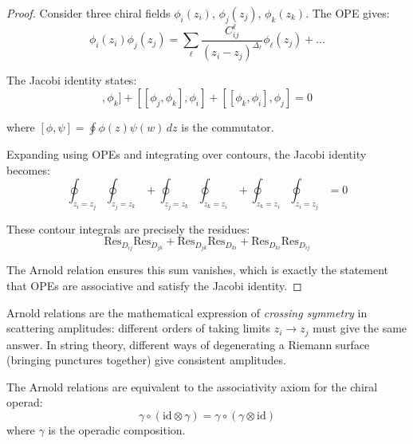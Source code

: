 \begin{proof}
Consider three chiral fields $\phi_i(z_i)$, $\phi_j(z_j)$, $\phi_k(z_k)$. The OPE gives:
\begin{equation}
\phi_i(z_i) \phi_j(z_j) = \sum_{\ell} \frac{C_{ij}^{\ell}}{(z_i - z_j)^{\Delta_\ell}} 
\phi_\ell(z_j) + \ldots
\end{equation}

The Jacobi identity states:
\begin{equation}
[[\phi_i, \phi_j], \phi_k] + [[\phi_j, \phi_k], \phi_i] + [[\phi_k, \phi_i], \phi_j] = 0
\end{equation}

where $[\phi, \psi] = \oint \phi(z) \psi(w) \, dz$ is the commutator.

Expanding using OPEs and integrating over contours, the Jacobi identity becomes:
\begin{equation}
\oint_{z_i = z_j} \oint_{z_j = z_k} + \oint_{z_j = z_k} \oint_{z_k = z_i} + 
\oint_{z_k = z_i} \oint_{z_i = z_j} = 0
\end{equation}

These contour integrals are precisely the residues:
\begin{equation}
\text{Res}_{D_{ij}} \text{Res}_{D_{jk}} + \text{Res}_{D_{jk}} \text{Res}_{D_{ki}} + 
\text{Res}_{D_{ki}} \text{Res}_{D_{ij}}
\end{equation}

The Arnold relation ensures this sum vanishes, which is exactly the statement that OPEs
are associative and satisfy the Jacobi identity.
\end{proof}

\begin{remark}
Arnold relations are the mathematical expression of
\emph{crossing symmetry} in scattering amplitudes: different orders of
taking limits $z_i \to z_j$ must give the same answer.  In string
theory, different ways of degenerating a Riemann surface (bringing
punctures together) give consistent amplitudes.
\end{remark}

\begin{corollary}
\label{cor:arnold-operadic}
The Arnold relations are equivalent to the associativity axiom for the chiral operad:
\begin{equation}
\gamma \circ (\text{id} \otimes \gamma) = \gamma \circ (\gamma \otimes \text{id})
\end{equation}
where $\gamma$ is the operadic composition.
\end{corollary}

